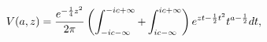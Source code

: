 \[\mathop{V\/}\nolimits\!\left(a,z\right)=\frac{e^{-\frac{1}{4}z^{2}}}{2\pi}\*%
\left(\int_{-ic-\infty}^{-ic+\infty}+\int_{ic-\infty}^{ic+\infty}\right)e^{zt-%
\frac{1}{2}t^{2}}t^{a-\frac{1}{2}}dt,\]